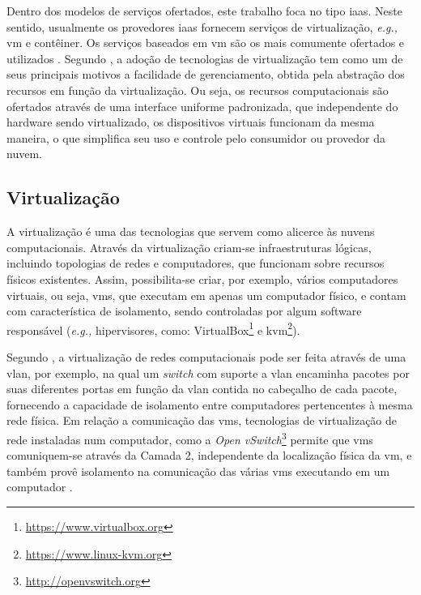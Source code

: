 Dentro dos modelos de serviços ofertados, este trabalho foca no tipo \ac{iaas}.
%
Neste sentido, usualmente os provedores \ac{iaas} fornecem serviços de virtualização, \textit{e.g.,} \ac{vm} e contêiner.
%
Os serviços baseados em \ac{vm} são os mais comumente ofertados e utilizados \cite{nicodemus:2016:conteineres}.
%
Segundo , a adoção de tecnologias de virtualização tem como um de seus principais motivos a facilidade de gerenciamento, obtida pela abstração dos recursos em função da virtualização.
%
Ou seja, os recursos computacionais são ofertados através de uma interface uniforme padronizada, que independente do hardware sendo virtualizado, os dispositivos virtuais funcionam da mesma maneira, o que simplifica seu uso e controle pelo consumidor ou provedor da nuvem.

%
%


\subsection{Virtualização}

A virtualização é uma das tecnologias que servem como alicerce às nuvens computacionais.
%
Através da virtualização criam-se infraestruturas lógicas, incluindo topologias de redes e computadores, que funcionam sobre recursos físicos existentes.
%
Assim, possibilita-se criar, por exemplo, vários computadores virtuais, ou seja, \acp{vm}, que executam em apenas um computador físico, e contam com característica de isolamento, sendo controladas por algum software responsável (\textit{e.g.,} hipervisores, como: VirtualBox\footnote{\url{https://www.virtualbox.org}} e \ac{kvm}\footnote{\url{https://www.linux-kvm.org}}).

Segundo , a virtualização de redes computacionais pode ser feita através de uma \ac{vlan}, por exemplo, na qual um \textit{switch} com suporte a \ac{vlan} encaminha pacotes por suas diferentes portas em função da \ac{vlan} contida no cabeçalho de cada pacote, fornecendo a capacidade de isolamento entre computadores pertencentes à mesma rede física.
%
Em relação a comunicação das \acp{vm}, tecnologias de virtualização de rede instaladas num computador, como a \textit{Open vSwitch}\footnote{\url{http://openvswitch.org}} permite que \acp{vm} comuniquem-se através da Camada 2, independente da localização física da \ac{vm}, e também provê isolamento na comunicação das várias \acp{vm} executando em um computador \cite{callegati:2014:openstackVirtualization}.

